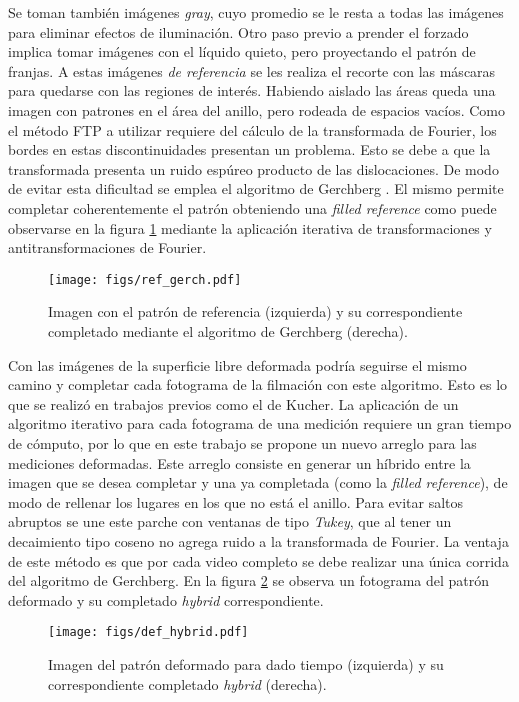 \documentclass[../main.tex]{subfiles}
\begin{document}
Se toman también imágenes \textit{gray}, cuyo promedio se le resta a todas las imágenes para eliminar efectos de iluminación. Otro paso previo a prender el forzado implica tomar imágenes con el líquido quieto, pero proyectando el patrón de franjas. A estas imágenes \textit{de referencia} se les realiza el recorte con las máscaras para quedarse con las regiones de interés. Habiendo aislado las áreas queda una imagen con patrones en el área del anillo, pero rodeada de espacios vacíos. Como el método FTP a utilizar requiere del cálculo de la transformada de Fourier, los bordes en estas discontinuidades presentan un problema. Esto se debe a que la transformada presenta un ruido espúreo producto de las dislocaciones. De modo de evitar esta dificultad se emplea el algoritmo de Gerchberg \cite{gerchberg_super-resolution_1974}. El mismo permite completar coherentemente el patrón obteniendo una \textit{filled reference }como puede observarse en la figura \ref{fig:ref_gerch} mediante la aplicación iterativa de transformaciones y antitransformaciones de Fourier. 

\begin{figure}[H]
    \centering
    \texttt{[image: figs/ref\_gerch.pdf]}
    \caption{Imagen con el patrón de referencia (izquierda) y su correspondiente completado mediante el algoritmo de Gerchberg (derecha).}
    \label{fig:ref_gerch}
\end{figure}

Con las imágenes de la superficie libre deformada podría seguirse el mismo camino y completar cada fotograma de la filmación con este algoritmo. Esto es lo que se realizó en trabajos previos como el de Kucher. La aplicación de un algoritmo iterativo para cada fotograma de una medición requiere un gran tiempo de cómputo, por lo que en este trabajo se propone un nuevo arreglo para las mediciones deformadas. Este arreglo consiste en generar un híbrido entre la imagen que se desea completar y una ya completada (como la \textit{filled reference}), de modo de rellenar los lugares en los que no está el anillo. Para evitar saltos abruptos se une este parche con ventanas de tipo \textit{Tukey}, que al tener un decaimiento tipo coseno no agrega ruido a la transformada de Fourier. La ventaja de este método es que por cada video completo se debe realizar una única corrida del algoritmo de Gerchberg. 
En la figura \ref{fig:deformed_hybrid} se observa un fotograma del patrón deformado y su completado \textit{hybrid} correspondiente. 

\begin{figure}[H]
    \centering
    \texttt{[image: figs/def\_hybrid.pdf]}
    \caption{Imagen del patrón deformado para dado tiempo (izquierda) y su correspondiente completado \textit{hybrid} (derecha).}
    \label{fig:deformed_hybrid}
\end{figure}
\end{document}
